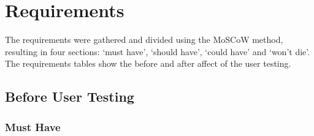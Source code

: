 \documentclass[requirements.tex]{subfiles}
\begin{document}
\section{Requirements} %
\label{sec:requirements}
The requirements were gathered and divided using the MoSCoW method, resulting
in four sections: `must have', `should have', `could have' and `won't die'. The
requirements tables show the before and after affect of the user testing.

\subsection{Before User Testing} %
\label{sub:before_user_testing}
\subsubsection{Must Have} %
\label{ssub:before_must_have}
\end{document}
